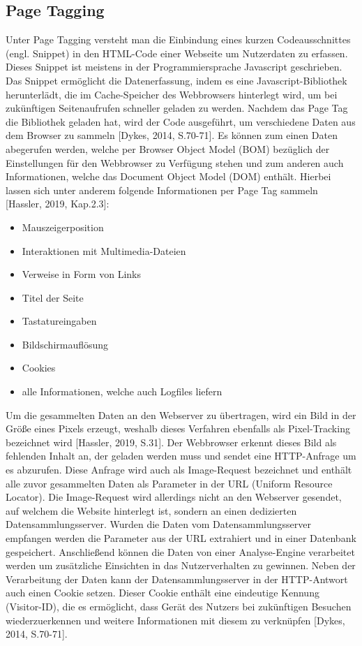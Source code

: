 \subsection{Page Tagging}
\label{sec:pagetagging}
Unter Page Tagging versteht man die Einbindung eines kurzen Codeausschnittes (engl. Snippet) in den HTML-Code einer Webseite um Nutzerdaten zu erfassen. Dieses Snippet ist meistens in der Programmiersprache Javascript geschrieben. Das Snippet ermöglicht die Datenerfassung, indem es eine Javascript-Bibliothek herunterlädt, die im Cache-Speicher des Webbrowsers hinterlegt wird, um bei zukünftigen Seitenaufrufen schneller geladen zu werden. Nachdem das Page Tag die Bibliothek geladen hat, wird der Code ausgeführt, um verschiedene Daten aus dem Browser zu sammeln [Dykes, 2014, S.70-71]. Es können zum einen Daten abegerufen werden, welche per Browser Object Model (BOM) bezüglich der Einstellungen für den Webbrowser zu Verfügung stehen und zum anderen auch Informationen, welche das Document Object Model (DOM) enthält. Hierbei lassen sich unter anderem folgende Informationen per Page Tag sammeln [Hassler, 2019, Kap.2.3]:  

\begin{itemize}
    \item Mauszeigerposition
    \item Interaktionen mit Multimedia-Dateien
    \item Verweise in Form von Links
    \item Titel der Seite
    \item Tastatureingaben
    \item Bildschirmauflösung
    \item Cookies
    \item alle Informationen, welche auch Logfiles liefern
\end{itemize}

Um die gesammelten Daten an den Webserver zu übertragen, wird ein Bild in der Größe eines Pixels erzeugt, weshalb dieses Verfahren ebenfalls als Pixel-Tracking bezeichnet wird [Hassler, 2019, S.31]. Der Webbrowser erkennt dieses Bild als fehlenden Inhalt an, der geladen werden muss und sendet eine HTTP-Anfrage um es abzurufen. Diese Anfrage wird auch als Image-Request bezeichnet und enthält alle zuvor gesammelten Daten als Parameter in der URL (Uniform Resource Locator). Die Image-Request wird allerdings nicht an den Webserver gesendet, auf welchem die Website hinterlegt ist, sondern an einen dedizierten Datensammlungsserver. Wurden die Daten vom Datensammlungsserver empfangen werden die Parameter aus der URL extrahiert und in einer Datenbank gespeichert. Anschließend können die Daten von einer Analyse-Engine verarbeitet werden um zusätzliche Einsichten in das Nutzerverhalten zu gewinnen. Neben der Verarbeitung der Daten kann der Datensammlungsserver in der HTTP-Antwort auch einen Cookie setzen. Dieser Cookie enthält eine eindeutige Kennung (Visitor-ID), die es ermöglicht, dass Gerät des Nutzers bei zukünftigen Besuchen wiederzuerkennen und weitere Informationen mit diesem zu verknüpfen [Dykes, 2014, S.70-71].

